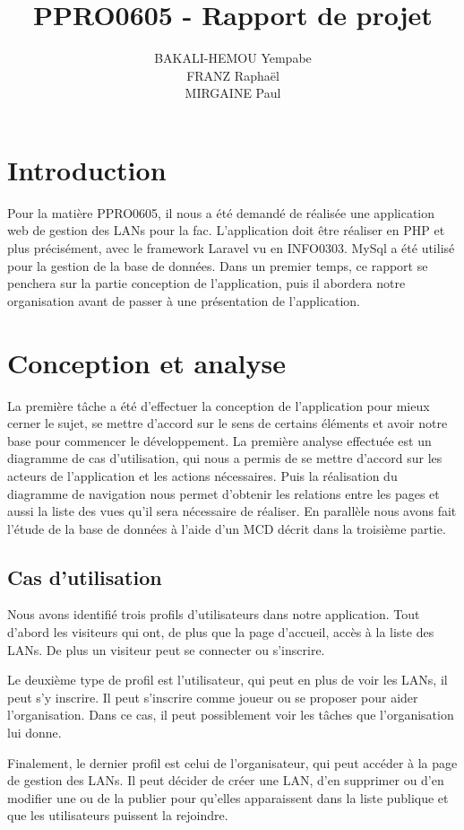 \documentclass[12pt]{article}
\title{\textbf{PPRO0605 - Rapport de projet}}
\author{
		BAKALI-HEMOU Yempabe\\
		FRANZ Raphaël\\
		MIRGAINE Paul
		}
\date{}
\begin{document}


\section*{Introduction}

Pour la matière PPRO0605, il nous a été demandé de réalisée une application web de gestion des LANs pour la fac. L'application doit être réaliser en PHP et plus précisément, avec le framework Laravel vu en INFO0303. MySql a été utilisé pour la gestion de la base de données. Dans un premier temps, ce rapport se penchera sur la partie conception de l'application, puis il abordera notre organisation avant de passer à une présentation de l'application.
\tableofcontents

\newpage

\section{Conception et analyse}
La première tâche a été d'effectuer la conception de l'application pour mieux cerner le sujet, se mettre d'accord sur le sens de certains éléments et avoir notre base pour commencer le développement. La première analyse effectuée est un diagramme de cas d'utilisation, qui nous a permis de se mettre d'accord sur les acteurs de l'application et les actions nécessaires. Puis la réalisation du diagramme de navigation nous permet d'obtenir les relations entre les pages et aussi la liste des vues qu'il sera nécessaire de réaliser. En parallèle nous avons fait l'étude de la base de données à l'aide d'un MCD décrit dans la troisième partie.
\subsection{Cas d'utilisation}

Nous avons identifié trois profils d'utilisateurs dans notre application. Tout d'abord les visiteurs qui ont, de plus que la page d'accueil, accès à la liste des LANs. De plus un visiteur peut se connecter ou s'inscrire. 
\newline

Le deuxième type de profil est l'utilisateur, qui peut en plus de voir les LANs, il peut s'y inscrire. Il peut s'inscrire comme joueur ou se proposer pour aider l'organisation. Dans ce cas, il peut possiblement voir les tâches que l'organisation lui donne. 
\newline

Finalement, le dernier profil est celui de l'organisateur, qui peut accéder à la page de gestion des LANs. Il peut décider de créer une LAN, d'en supprimer ou d'en modifier une ou de la publier pour qu'elles apparaissent dans la liste publique et que les utilisateurs puissent la rejoindre.
\newline
\end{document}
